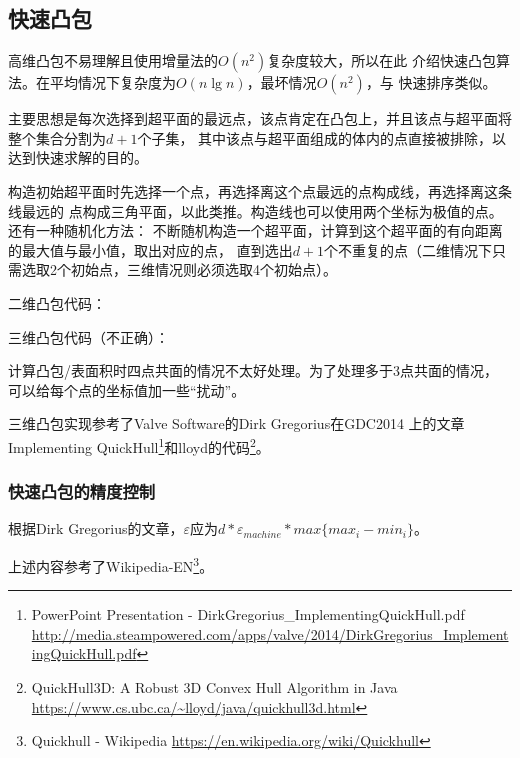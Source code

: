 \subsection{快速凸包}
高维凸包不易理解且使用增量法的$O(n^2)$复杂度较大，所以在此
介绍快速凸包算法。在平均情况下复杂度为$O(n\lg n)$，最坏情况$O(n^2)$，与
快速排序类似。

主要思想是每次选择到超平面的最远点，该点肯定在凸包上，并且该点与超平面将整个集合分割为$d+1$个子集，
其中该点与超平面组成的体内的点直接被排除，以达到快速求解的目的。

构造初始超平面时先选择一个点，再选择离这个点最远的点构成线，再选择离这条线最远的
点构成三角平面，以此类推。构造线也可以使用两个坐标为极值的点。还有一种随机化方法：
不断随机构造一个超平面，计算到这个超平面的有向距离的最大值与最小值，取出对应的点，
直到选出$d+1$个不重复的点（二维情况下只需选取2个初始点，三维情况则必须选取4个初始点）。

二维凸包代码：

三维凸包代码（不正确）：

计算凸包/表面积时四点共面的情况不太好处理。为了处理多于3点共面的情况，
可以给每个点的坐标值加一些``扰动''。


三维凸包实现参考了Valve Software的Dirk Gregorius在GDC2014
上的文章Implementing QuickHull\footnote{
	PowerPoint Presentation - DirkGregorius\_ImplementingQuickHull.pdf
	\url{http://media.steampowered.com/apps/valve/2014/DirkGregorius\_ImplementingQuickHull.pdf}
}和lloyd的代码\footnote{
	QuickHull3D: A Robust 3D Convex Hull Algorithm in Java
	\url{https://www.cs.ubc.ca/\~lloyd/java/quickhull3d.html}
}。

\subsubsection{快速凸包的精度控制}
根据Dirk Gregorius的文章，$\varepsilon$应为$d*\varepsilon_{machine}*max\{max_i-min_i\}$。

上述内容参考了Wikipedia-EN\footnote{
	Quickhull - Wikipedia
	\url{https://en.wikipedia.org/wiki/Quickhull}
}。
